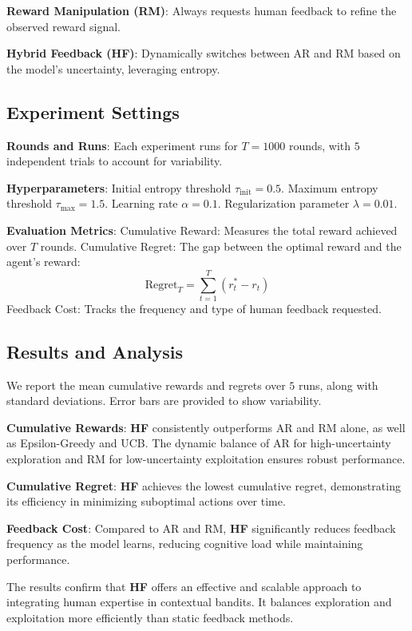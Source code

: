 \textbf{Reward Manipulation (RM)}:
  Always requests human feedback to refine the observed reward signal.

\textbf{Hybrid Feedback (HF)}:
  Dynamically switches between AR and RM based on the model’s uncertainty, leveraging entropy.

\subsection{Experiment Settings}

\textbf{Rounds and Runs}:
  Each experiment runs for \(T = 1000\) rounds, with \(5\) independent trials to account for variability.

\textbf{Hyperparameters}:
  Initial entropy threshold \(\tau_{\text{init}} = 0.5\).
  Maximum entropy threshold \(\tau_{\text{max}} = 1.5\).
  Learning rate \(\alpha = 0.1\).
  Regularization parameter \(\lambda = 0.01\).

\textbf{Evaluation Metrics}: Cumulative Reward: Measures the total reward achieved over \(T\) rounds. Cumulative Regret: The gap between the optimal reward and the agent’s reward:
    \[
    \text{Regret}_T = \sum_{t=1}^T \left( r_t^* - r_t \right)
    \]
Feedback Cost: Tracks the frequency and type of human feedback requested.

\subsection{Results and Analysis}

We report the mean cumulative rewards and regrets over \(5\) runs, along with standard deviations. Error bars are provided to show variability.

\textbf{Cumulative Rewards}:
  \textbf{HF} consistently outperforms AR and RM alone, as well as Epsilon-Greedy and UCB.
  The dynamic balance of AR for high-uncertainty exploration and RM for low-uncertainty exploitation ensures robust performance.

\textbf{Cumulative Regret}:
  \textbf{HF} achieves the lowest cumulative regret, demonstrating its efficiency in minimizing suboptimal actions over time.

\textbf{Feedback Cost}:
 Compared to AR and RM, \textbf{HF} significantly reduces feedback frequency as the model learns, reducing cognitive load while maintaining performance.

The results confirm that \textbf{HF} offers an effective and scalable approach to integrating human expertise in contextual bandits. It balances exploration and exploitation more efficiently than static feedback methods.